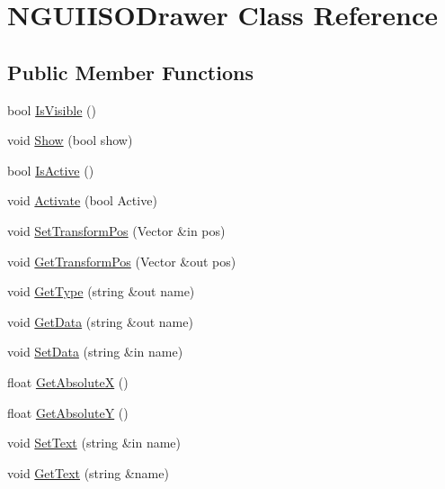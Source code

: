 \hypertarget{class_n_g_u_i_i_s_o_drawer}{}\section{N\+G\+U\+I\+I\+S\+O\+Drawer Class Reference}
\label{class_n_g_u_i_i_s_o_drawer}
\subsection*{Public Member Functions}
\begin{DoxyCompactItemize}
\item 
bool \hyperlink{class_n_g_u_i_i_s_o_drawer_a934330d4104add952430eb7b7f81a6bb}{Is\+Visible} ()
\item 
void \hyperlink{class_n_g_u_i_i_s_o_drawer_a2f9c5b7ff0d93b2d90d73b1bd4620ce9}{Show} (bool show)
\item 
bool \hyperlink{class_n_g_u_i_i_s_o_drawer_aca0e399b047b07c00ca9158721542615}{Is\+Active} ()
\item 
void \hyperlink{class_n_g_u_i_i_s_o_drawer_a0adb8dccc36f4c2c2f0cd5b0eaaf3a66}{Activate} (bool Active)
\item 
void \hyperlink{class_n_g_u_i_i_s_o_drawer_a2aefdf83e426c25615ea50a9530b5191}{Set\+Transform\+Pos} (Vector \&in pos)
\item 
void \hyperlink{class_n_g_u_i_i_s_o_drawer_a9ff810d55ed62edcabe81e67e9bb7430}{Get\+Transform\+Pos} (Vector \&out pos)
\item 
void \hyperlink{class_n_g_u_i_i_s_o_drawer_a92a046d15ee074ef5a0ce2bc4ee4018a}{Get\+Type} (string \&out name)
\item 
void \hyperlink{class_n_g_u_i_i_s_o_drawer_a7c916a027b1880fba87cfb161b95c3f3}{Get\+Data} (string \&out name)
\item 
void \hyperlink{class_n_g_u_i_i_s_o_drawer_a2e8d8abf2cb0b2b0d86669f8a3547cf7}{Set\+Data} (string \&in name)
\item 
float \hyperlink{class_n_g_u_i_i_s_o_drawer_ab4ca3a35c2c97985c24f707a4d725388}{Get\+AbsoluteX} ()
\item 
float \hyperlink{class_n_g_u_i_i_s_o_drawer_a37c0a77fc7267faccd1647fd85a4ae7f}{Get\+AbsoluteY} ()
\item 
void \hyperlink{class_n_g_u_i_i_s_o_drawer_ade75af70444ce0dacaecd2599d7a3c8b}{Set\+Text} (string \&in name)
\item 
void \hyperlink{class_n_g_u_i_i_s_o_drawer_a5872b67e88fc63d235105be262a36aeb}{Get\+Text} (string \&name)
\item 

\end{DoxyCompactItemize}
